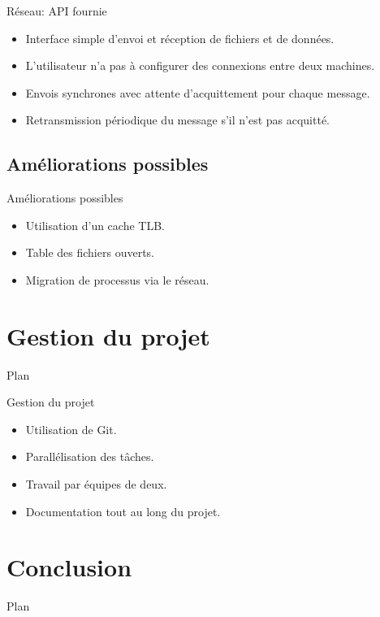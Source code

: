 \documentclass{beamer}
\begin{document}
\begin{frame}{Réseau: API fournie}
	\begin{itemize}
        \item Interface simple d'envoi et réception de fichiers et de données.
        \item L'utilisateur n'a pas à configurer des connexions entre deux machines.
        \item Envois synchrones avec attente d'acquittement pour chaque message.
        \item Retransmission périodique du message s'il n'est pas acquitté.
    \end{itemize}
    
\end{frame}

\subsection{Améliorations possibles}
\begin{frame}{Améliorations possibles}
    \begin{itemize}
        \item Utilisation d'un cache TLB.
        \item Table des fichiers ouverts.
        \item Migration de processus via le réseau.
    \end{itemize}
\end{frame}

\section{Gestion du projet}
\begin{frame}{Plan}
    \tableofcontents[currentsection]
\end{frame}

\begin{frame}{Gestion du projet}
    \begin{itemize}
        \item Utilisation de Git.
        \item Parallélisation des tâches.
        \item Travail par équipes de deux.
        \item Documentation tout au long du projet.
    \end{itemize}
\end{frame}

\section{Conclusion}
\begin{frame}{Plan}
    \tableofcontents[currentsection]
\end{frame}
\end{document}
